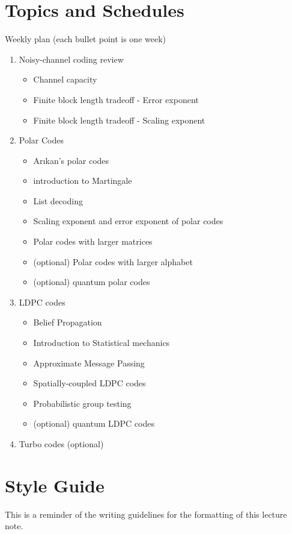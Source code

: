 \section{Topics and Schedules}
Weekly plan (each bullet point is one week)
\begin{enumerate}
    \item Noisy-channel coding review
    \begin{itemize}
        \item Channel capacity
        \item Finite block length tradeoff - Error exponent
        \item Finite block length tradeoff - Scaling exponent
    \end{itemize}
    \item Polar Codes
    \begin{itemize}
        \item Ar{\i}kan's polar codes
        \item introduction to Martingale
        \item List decoding
        \item Scaling exponent and error exponent of polar codes
        \item Polar codes with larger matrices
        \item (optional) Polar codes with larger alphabet
        \item (optional) quantum polar codes
    \end{itemize}
    \item LDPC codes
    \begin{itemize}
        \item Belief Propagation
        \item Introduction to Statistical mechanics
        \item Approximate Message Passing
        \item Spatially-coupled LDPC codes
        \item Probabilistic group testing
        \item (optional) quantum LDPC codes
    \end{itemize}
    \item Turbo codes (optional)
\end{enumerate}

\newpage


\section{Style Guide}
This is a reminder of the writing guidelines for the formatting of this lecture note.

